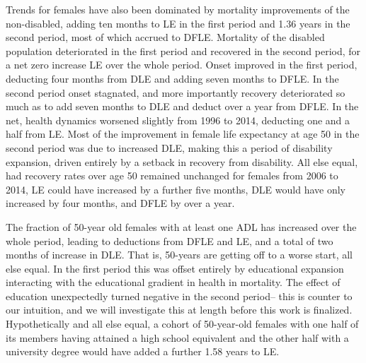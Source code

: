 Trends for females have also been dominated by mortality improvements of the non-disabled, adding ten months to LE in the first period and 1.36 years in the second period, most of which accrued to DFLE. Mortality of the disabled population deteriorated in the first period and recovered in the second period, for a net zero increase LE over the whole period. Onset improved in the first period, deducting four months from DLE and adding seven months to DFLE. In the second period onset stagnated, and more importantly recovery deteriorated so much as to add seven months to DLE and deduct over a year from DFLE. In the net, health dynamics worsened slightly from 1996 to 2014, deducting one and a half from LE. Most of the improvement in female life expectancy at age 50 in the second period was due to increased DLE, making this a period of disability expansion, driven entirely by a setback in recovery from disability. All else equal, had recovery rates over age 50 remained unchanged for females from 2006 to 2014, LE could have increased by a further five months, DLE would have only increased by four months, and DFLE by over a year. 

The fraction of 50-year old females with at least one ADL has increased over the whole period, leading to deductions from DFLE and LE, and a total of two months of increase in DLE. That is, 50-years are getting off to a worse start, all else equal. In the first period this was offset entirely by educational expansion interacting with the educational gradient in health in mortality. The effect of education unexpectedly turned negative in the second period-- this is counter to our intuition, and we will investigate this at length before this work is finalized. Hypothetically and all else equal, a cohort of 50-year-old females with one half of its members having attained a high school equivalent and the other half with a university degree would have added a further 1.58 years to LE.


